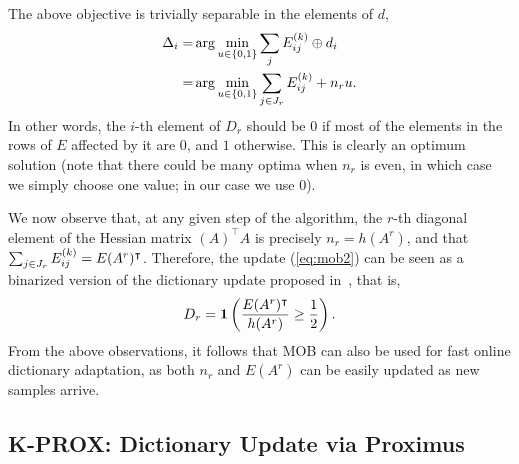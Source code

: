 \documentclass[twocolumn]{IEEEtran}
\theoremstyle{definition}
\def\transp{^\intercal}
\newcommand{\refeq}[1]{(\ref{#1})}
\begin{document}
The above objective is trivially separable in the elements of $d$,
 \begin{eqnarray}
 \Delta_i  =& \arg\min_{u \in \{0,1\}} \sum_j E_{ij}\iter{k} \oplus d_i\\
 =& \arg\min_{u \in \{0,1\}} \sum_{j\in J_r} E_{ij}\iter{k} + n_r u.
\label{eq:mob2}
 \end{eqnarray}
In other words, the $i$-th element of $D_r$ should be $0$ if most of the elements in the rows of $E$ affected by it are $0$, and $1$ otherwise. 
This is clearly an optimum solution (note that there could be many optima  when $n_r$ is even, in which case we simply choose one value; in our case we use $0$).

We now observe that, at any given step of the algorithm, the $r$-th diagonal element of the Hessian matrix $(A)\transp{A}$ is precisely $n_r=h(A^r)$, and that $\sum_{j\in J_r} E_{ij}\iter{k}=E(A^r)\transp$. Therefore, the update \refeq{eq:mob2} can be seen as a binarized version of the dictionary update proposed in~\cite{online-dl}, that is, 
$$D_r = \indicator\left(\frac{E(A^r)\transp}{h(A^r)} \geq \frac{1}{2}\right).$$
From the above observations, it follows that MOB can also be used for fast online dictionary adaptation, as both $n_r$ and $E(A^r)$ can be easily updated as new samples arrive.

\subsection{K-PROX: Dictionary Update via Proximus}
\label{sec:bdl:k-prox}
\end{document}

